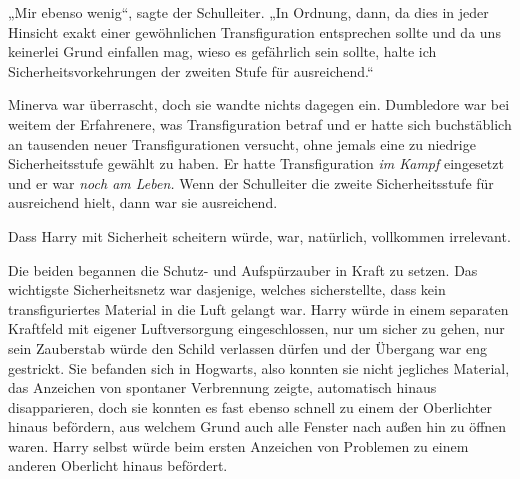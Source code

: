 „Mir ebenso wenig“, sagte der Schulleiter. „In Ordnung, dann, da dies in jeder Hinsicht exakt einer gewöhnlichen Transfiguration entsprechen sollte und da uns keinerlei Grund einfallen mag, wieso es gefährlich sein sollte, halte ich Sicherheitsvorkehrungen der zweiten Stufe für ausreichend.“

Minerva war überrascht, doch sie wandte nichts dagegen ein. Dumbledore war bei weitem der Erfahrenere, was Transfiguration betraf und er hatte sich buchstäblich an tausenden neuer Transfigurationen versucht, ohne jemals eine zu niedrige Sicherheitsstufe gewählt zu haben. Er hatte Transfiguration \emph{im Kampf} eingesetzt und er war \emph{noch am Leben.} Wenn der Schulleiter die zweite Sicherheitsstufe für ausreichend hielt, dann war sie ausreichend.

Dass Harry mit Sicherheit scheitern würde, war, natürlich, vollkommen irrelevant.

Die beiden begannen die Schutz- und Aufspürzauber in Kraft zu setzen. Das wichtigste Sicherheitsnetz war dasjenige, welches sicherstellte, dass kein transfiguriertes Material in die Luft gelangt war. Harry würde in einem separaten Kraftfeld mit eigener Luftversorgung eingeschlossen, nur um sicher zu gehen, nur sein Zauberstab würde den Schild verlassen dürfen und der Übergang war eng gestrickt. Sie befanden sich in Hogwarts, also konnten sie nicht jegliches Material, das Anzeichen von spontaner Verbrennung zeigte, automatisch hinaus disapparieren, doch sie konnten es fast ebenso schnell zu einem der Oberlichter hinaus befördern, aus welchem Grund auch alle Fenster nach außen hin zu öffnen waren. Harry selbst würde beim ersten Anzeichen von Problemen zu einem anderen Oberlicht hinaus befördert.

